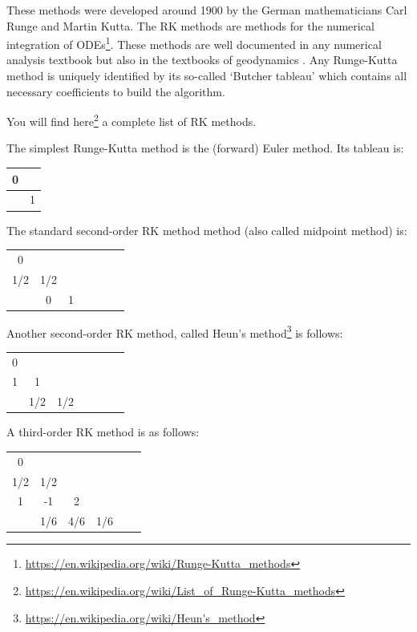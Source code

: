 These methods were developed around 1900 by the German mathematicians Carl Runge and Martin Kutta.
The RK methods are methods for the numerical integration of 
ODEs\footnote{\url{https://en.wikipedia.org/wiki/Runge-Kutta_methods}}. These methods are well 
documented in any numerical analysis textbook but also in the textbooks of geodynamics \cite{gery10,tack10}.
Any Runge-Kutta method is uniquely identified by its so-called `Butcher tableau' which contains 
all necessary coefficients to build the algorithm.

You will find here\footnote{\url{https://en.wikipedia.org/wiki/List_of_Runge-Kutta_methods}}
a complete list of RK methods.

The simplest Runge-Kutta method is the (forward) Euler method. Its tableau is:

\begin{mdframed}[backgroundcolor=blue!5]
\begin{tabular}{c|c}
0 & \\
\hline
 & 1
\end{tabular}
\end{mdframed}

 
The standard second-order RK method method (also called midpoint method) is:

\begin{mdframed}[backgroundcolor=blue!5]
\begin{tabular}{c|cccccc}
0 & \\
1/2 & 1/2 \\
\hline
 & 0 & 1 
\end{tabular}
\end{mdframed}

Another second-order RK method, called Heun's 
method\footnote{\url{https://en.wikipedia.org/wiki/Heun's_method}} is follows:

\begin{mdframed}[backgroundcolor=blue!5]
\begin{tabular}{c|cccccc}
0 & \\
1 & 1 \\
\hline
 & 1/2 & 1/2 
\end{tabular}
\end{mdframed}

A third-order RK method is as follows:

\begin{mdframed}[backgroundcolor=blue!5]
\begin{tabular}{c|ccccc}
0 & \\
1/2 & 1/2 \\
1 & -1 & 2 \\ 
\hline
 & 1/6 & 4/6  & 1/6
\end{tabular}
\end{mdframed}


